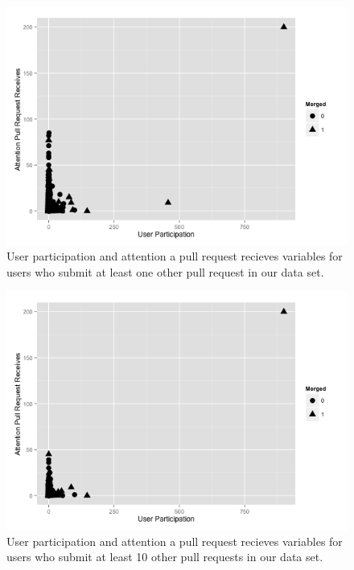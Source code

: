 \documentclass{sigchi}
\begin{document}
\begin{figure}[p] \centering
\includegraphics[scale=0.6]{figures/aprr_up_repeaters_ggplot.png} \caption{User
participation and attention a pull request recieves variables for users who
submit at least one other pull request in our data set.}
\label{fig:aprr_up_repeaters} \end{figure}

\begin{figure}[p] \centering
\includegraphics[scale=0.6]{figures/aprr_up_repeaters_10_ggplot.png}
\caption{User participation and attention a pull request recieves variables for
users who submit at least 10 other pull requests in our data set.}
\label{fig:aprr_up_repeaters_10} \end{figure}
\end{document}
